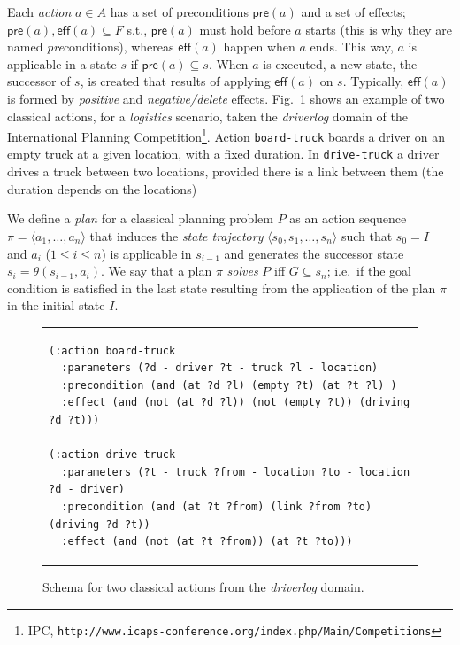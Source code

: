 \documentclass[runningheads]{llncs}
\newcommand{\tup}[1]{{\langle #1 \rangle}}
\newcommand{\pre}{\mathsf{pre}}    %
\newcommand{\eff}{\mathsf{eff}}    %
\begin{document}
Each {\em action} $a \in A$ has a set of preconditions $\pre(a)$ and a set of effects; $\pre(a), \eff(a) \subseteq F$ s.t., $\pre(a)$ must hold before $a$ starts (this is why they are named \emph{pre}conditions), whereas $\eff(a)$ happen when $a$ ends. This way, $a$ is applicable in a state $s$ if $\pre(a) \subseteq s$. When $a$ is executed, a new state, the successor of $s$, is created that results of applying $\eff(a)$ on $s$. Typically, $\eff(a)$ is formed by {\em positive} and {\em negative/delete} effects. Fig.~\ref{fig:exampleactions1} shows an example of two classical actions, for a {\em logistics} scenario, taken the \emph{driverlog} domain of the International Planning Competition\footnote{IPC, \texttt{http://www.icaps-conference.org/index.php/Main/Competitions}}. Action \texttt{board-truck} boards a driver on an empty truck at a given location, with a fixed duration. In \texttt{drive-truck} a driver drives a truck between two locations, provided there is a link between them (the duration depends on the locations)

We define a {\em plan} for a classical planning problem $P$ as an action sequence $\pi=\tup{a_1, \ldots, a_n}$ that induces the {\em state trajectory} $\tup{s_0, s_1, \ldots, s_n}$ such that $s_0=I$ and $a_i$ ({\small $1\leq i\leq n$}) is applicable in $s_{i-1}$ and generates the successor state $s_i=\theta(s_{i-1},a_i)$. We say that a plan $\pi$ {\em solves} $P$ iff $G\subseteq s_n$; i.e.~if the goal condition is satisfied in the last state resulting from the application of the plan $\pi$ in the initial state $I$.


\begin{figure}
\begin{tabular}{p{\textwidth}}
\begin{verbatim}
(:action board-truck
  :parameters (?d - driver ?t - truck ?l - location)
  :precondition (and (at ?d ?l) (empty ?t) (at ?t ?l) )
  :effect (and (not (at ?d ?l)) (not (empty ?t)) (driving ?d ?t)))

(:action drive-truck
  :parameters (?t - truck ?from - location ?to - location ?d - driver)
  :precondition (and (at ?t ?from) (link ?from ?to) (driving ?d ?t))
  :effect (and (not (at ?t ?from)) (at ?t ?to)))
\end{verbatim}
\end{tabular}
\label{fig:exampleactions1}
\caption{\small Schema for two classical actions from the {\em driverlog} domain.}
\end{figure}
\end{document}
